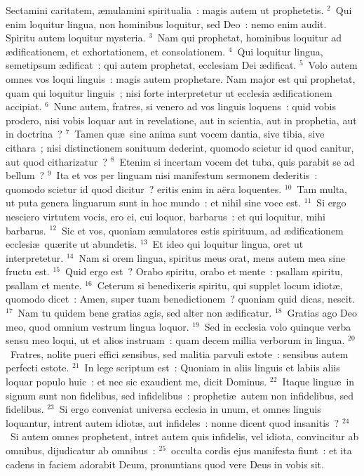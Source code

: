 \lettrine[lines=3,image=true,loversize=0.05,lraise=-0.03]{S}{}ectamini caritatem, \ae mulamini spiritualia~: magis autem ut prophetetis.
${}^{2}$~Qui enim loquitur lingua, non hominibus loquitur, sed Deo~: nemo enim audit. Spiritu autem loquitur mysteria.
${}^{3}$~Nam qui prophetat, hominibus loquitur ad \ae dificationem, et exhortationem, et consolationem.
${}^{4}$~Qui loquitur lingua, semetipsum \ae dificat~: qui autem prophetat, ecclesiam Dei \ae dificat.
${}^{5}$~Volo autem omnes vos loqui linguis~: magis autem prophetare. Nam major est qui prophetat, quam qui loquitur linguis~; nisi forte interpretetur ut ecclesia \ae dificationem accipiat.
${}^{6}$~Nunc autem, fratres, si venero ad vos linguis loquens~: quid vobis prodero, nisi vobis loquar aut in revelatione, aut in scientia, aut in prophetia, aut in doctrina~?
${}^{7}$~Tamen qu\ae\ sine anima sunt vocem dantia, sive tibia, sive cithara~; nisi distinctionem sonituum dederint, quomodo scietur id quod canitur, aut quod citharizatur~?
${}^{8}$~Etenim si incertam vocem det tuba, quis parabit se ad bellum~?
${}^{9}$~Ita et vos per linguam nisi manifestum sermonem dederitis~: quomodo scietur id quod dicitur~? eritis enim in a\"era loquentes.
${}^{10}$~Tam multa, ut puta genera linguarum sunt in hoc mundo~: et nihil sine voce est.
${}^{11}$~Si ergo nesciero virtutem vocis, ero ei, cui loquor, barbarus~: et qui loquitur, mihi barbarus.
${}^{12}$~Sic et vos, quoniam \ae mulatores estis spirituum, ad \ae dificationem ecclesi\ae\ qu\ae rite ut abundetis.
${}^{13}$~Et ideo qui loquitur lingua, oret ut interpretetur.
${}^{14}$~Nam si orem lingua, spiritus meus orat, mens autem mea sine fructu est.
${}^{15}$~Quid ergo est~? Orabo spiritu, orabo et mente~: psallam spiritu, psallam et mente.
${}^{16}$~Ceterum si benedixeris spiritu, qui supplet locum idiot\ae , quomodo dicet~: Amen, super tuam benedictionem~? quoniam quid dicas, nescit.
${}^{17}$~Nam tu quidem bene gratias agis, sed alter non \ae dificatur.
${}^{18}$~Gratias ago Deo meo, quod omnium vestrum lingua loquor.
${}^{19}$~Sed in ecclesia volo quinque verba sensu meo loqui, ut et alios instruam~: quam decem millia verborum in lingua.
${}^{20}$~Fratres, nolite pueri effici sensibus, sed malitia parvuli estote~: sensibus autem perfecti estote.
${}^{21}$~In lege scriptum est~: Quoniam in aliis linguis et labiis aliis loquar populo huic~: et nec sic exaudient me, dicit Dominus.
${}^{22}$~Itaque lingu\ae\ in signum sunt non fidelibus, sed infidelibus~: propheti\ae\ autem non infidelibus, sed fidelibus.
${}^{23}$~Si ergo conveniat universa ecclesia in unum, et omnes linguis loquantur, intrent autem idiot\ae , aut infideles~: nonne dicent quod insanitis~?
${}^{24}$~Si autem omnes prophetent, intret autem quis infidelis, vel idiota, convincitur ab omnibus, dijudicatur ab omnibus~:
${}^{25}$~occulta cordis ejus manifesta fiunt~: et ita cadens in faciem adorabit Deum, pronuntians quod vere Deus in vobis sit.


